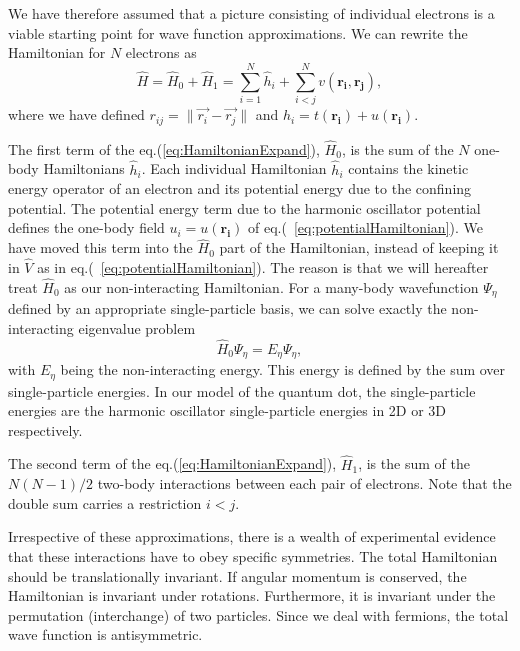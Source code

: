We have therefore assumed that a picture consisting of individual electrons is a viable starting point for wave function approximations. We can rewrite the Hamiltonian for $N$ electrons as
 \begin{equation}
\label{eq:HamiltonianExpand}
\hat{H}=\hat{H}_0+\hat{H}_1=\sum_{i=1}^{N}\hat{h}_i+ \sum_{i<j}^{N}v(\mathbf{r_i},\mathbf{r_j}),
 \end{equation}
where we have defined $r_{ij}=\parallel \vec{r_i}-\vec{r_j} \parallel$ and $\hat{h}_i=t(\mathbf{r_i})+u(\mathbf{r_i})$.

The first term of the eq.(\ref{eq:HamiltonianExpand}), $\hat{H}_0$, is the sum of the $N$ one-body Hamiltonians $\hat{h}_i$. Each individual Hamiltonian $\hat{h}_i$ contains the kinetic energy operator of an electron and its potential energy due to the confining potential. The potential energy term due to the harmonic oscillator potential defines the one-body field $u_i=u(\mathbf{r_i})$ of eq.(~\ref{eq:potentialHamiltonian}). We have moved this term into the $\hat{H}_0$ part of the Hamiltonian, instead of keeping it in $\hat{V}$ as in eq.(~\ref{eq:potentialHamiltonian}). The reason is that we will hereafter treat $\hat{H}_0$ as our non-interacting Hamiltonian. For a many-body wavefunction $\Psi_\eta$ defined by an appropriate single-particle basis, we can solve exactly the non-interacting eigenvalue problem
\begin{equation}
\nonumber
\hat{H}_0 \Psi_\eta= E_\eta \Psi_\eta,
\end{equation}
with $E_\eta$ being the non-interacting energy. This energy is defined by the sum over single-particle energies. In our model of the quantum dot, the single-particle energies are the harmonic oscillator single-particle energies in 2D or 3D respectively.

The second term of the eq.(\ref{eq:HamiltonianExpand}), $\hat{H}_1$, is the sum of the $N(N-1)/2$ two-body interactions between each pair of electrons. Note that the double sum carries a restriction $i<j$.


Irrespective of these approximations, there is a wealth of experimental evidence that these interactions have to obey specific symmetries. The total Hamiltonian should be translationally invariant. If angular momentum is conserved, the Hamiltonian is invariant under rotations. Furthermore, it is invariant under the permutation (interchange) of two particles. Since we deal with fermions, the total wave function is antisymmetric.

